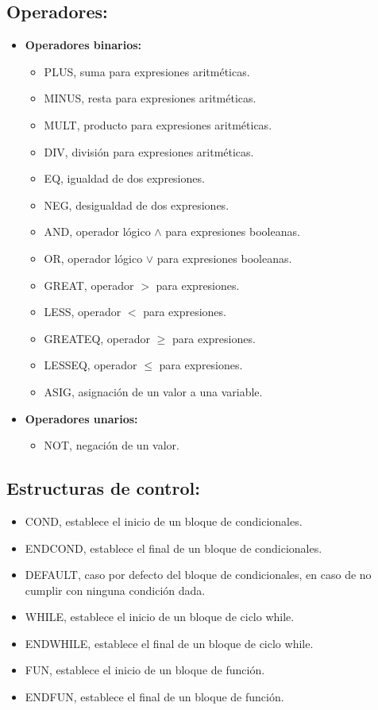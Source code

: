 \documentclass[12pt]{article}
\begin{document}
\subsection{Operadores:}
\begin{itemize}
  \item \textbf{Operadores binarios:}
  \begin{itemize}
  \item PLUS, suma para expresiones aritméticas.	
  \item MINUS, resta para expresiones aritméticas.
  \item MULT, producto para expresiones aritméticas.
  \item DIV, división para expresiones aritméticas.
  \item EQ, igualdad de dos expresiones.
  \item NEG, desigualdad de dos expresiones.
  \item AND, operador lógico $\land$ para expresiones booleanas.
  \item OR, operador lógico $\lor$ para expresiones booleanas.
  \item GREAT, operador $>$  para expresiones.
  \item LESS, operador $<$ para expresiones.
  \item GREATEQ, operador $\geq$ para expresiones.
  \item LESSEQ, operador $\leq$ para expresiones.
  \item ASIG, asignación de un valor a una variable.
  \end{itemize}
\item \textbf{Operadores unarios:}
  \begin{itemize}
  \item NOT, negación de un valor.
  \end{itemize}
\end{itemize}
\subsection{Estructuras de control:}
\begin{itemize}
 	\item COND, establece el inicio de un bloque de condicionales.
    \item ENDCOND, establece el final de un bloque de condicionales.
    \item DEFAULT, caso por defecto del bloque de condicionales, en caso de no cumplir con ninguna condición dada.
    \item WHILE, establece el inicio de un bloque de ciclo while.
    \item ENDWHILE, establece el final de un bloque de ciclo while.
    \item FUN, establece el inicio de un bloque de función.
    \item ENDFUN, establece el final de un bloque de función.
\end{itemize}
\end{document}
